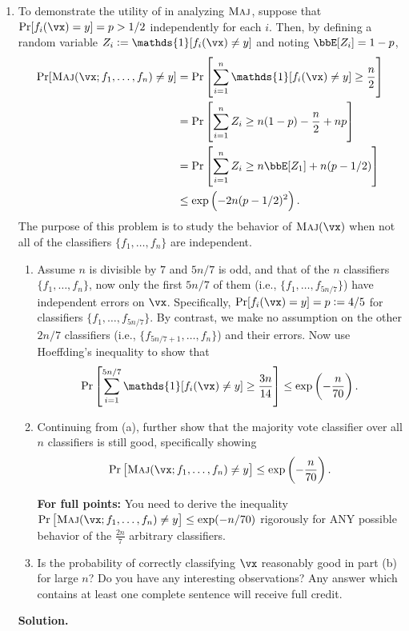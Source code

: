 \documentclass{article}
\def\1{\mathds{1}}
\theoremstyle{definition}
\theoremstyle{remark}
\newenvironment{Q}
{%
\clearpage
\item
}
{%
\phantom{s}%
\bigskip%
\noindent\textbf{Solution.}
}
\begin{document}
\begin{enumerate}[font={\Large\bfseries},left=0pt]
\begin{Q}
    To demonstrate the utility of  in analyzing $\textsc{Maj}$, suppose
    that $\Pr[ f_i(\vx) = y ] = p > 1/2$ independently for each $i$.
    Then, by defining a random variable $Z_i := \1[ f_i(\vx) \neq y]$
    and noting $\bbE [Z_i] = 1 - p$,
    \begin{align*}
      \Pr[\maj(\vx;f_1,\ldots,f_n) \neq y]
      &=
      \Pr\sbr{ \sum_{i=1}^n \1[ f_i(\vx) \neq y] \geq \frac n 2 }
      \\
      &=
      \Pr\sbr{ \sum_{i=1}^n Z_i \geq n(1-p) - \frac n 2 + np }
      \\
      &=
      \Pr\sbr{ \sum_{i=1}^n Z_i \geq n \bbE [Z_1] + n(p-1/2) }
      \\
      &\leq
      \exp\del{ -2n(p-1/2)^2 }.
    \end{align*}
    The purpose of this problem is to study the behavior of $\maj(\vx)$ when not all of the classifiers $\{f_1,\ldots,f_n\}$ are independent.
    \begin{enumerate}
      \item
        Assume $n$ is divisible by $7$ and $5n/7$ is odd,
        and that of the $n$ classifiers $\{f_1,\ldots,f_n\}$,
        now only the first $5n/7$ of them (i.e., $\{f_1,\ldots,f_{5n/7}\}$) have independent errors on $\vx$.
        Specifically, $\Pr[f_i(\vx) = y] = p := 4/5$ for classifiers $\{f_1,\ldots,f_{5n/7}\}$.
        By contrast, we make no assumption on the other $2n/7$ classifiers (i.e., $\{f_{5n/7+1},\ldots,f_{n}\}$) and their errors. Now use Hoeffding's inequality to show that            
        \[
          \Pr\sbr{ \sum_{i=1}^{5n/7} \1[ f_i(\vx) \neq y] \geq \frac{3n}{14} }\le
         \exp\del{ -\frac{n}{70}  }.
   \]
   
     \item Continuing from (a), further show that the majority vote classifier
     over all $n$ classifiers is still good,  specifically showing  \[
     \Pr\sbr{ \maj(\vx;f_1,\ldots,f_n) \neq y } \leq \exp\del{ -\frac{n}{70}  }.
     \]
     
 
 \textbf{For full points:} You need to derive the inequality $\Pr\sbr{ \maj(\vx;f_1,\dots,f_n) \neq y } \leq \exp(-n / 70)$ rigorously for ANY possible behavior of the $\frac{2n}{7}$ arbitrary classifiers.


     \item Is the probability of correctly classifying $\vx$ reasonably good in part (b) for large $n$? Do you have any interesting observations? Any answer which contains at least one complete sentence will receive full credit.
    \end{enumerate}


\end{Q}
\end{enumerate}
\end{document}
